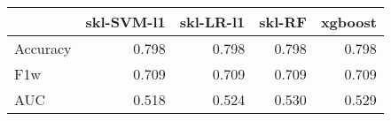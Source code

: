 \begin{tabular}{lrrrr}
\toprule
{} &  skl-SVM-l1 &  skl-LR-l1 &  skl-RF &  xgboost \\
\midrule
Accuracy &       0.798 &      0.798 &   0.798 &    0.798 \\
F1w      &       0.709 &      0.709 &   0.709 &    0.709 \\
AUC      &       0.518 &      0.524 &   0.530 &    0.529 \\
\bottomrule
\end{tabular}
